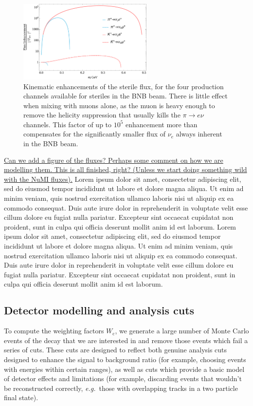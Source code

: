 \documentclass[11pt, a4paper]{article}
\def\eg{\emph{e.g.}}
\newcommand{\lorem}{ \textcolor[rgb]{0.8,0.8,0.8}{Lorem ipsum dolor sit amet, consectetur
adipiscing elit, sed do eiusmod tempor incididunt ut labore et dolore magna
aliqua. Ut enim ad minim veniam, quis nostrud exercitation ullamco laboris nisi
ut aliquip ex ea commodo consequat. Duis aute irure dolor in reprehenderit in
voluptate velit esse cillum dolore eu fugiat nulla pariatur. Excepteur sint
occaecat cupidatat non proident, sunt in culpa qui officia deserunt mollit anim
id est laborum.}}
\newcommand{\newtext}[2]{\textcolor{#1}{\ul{#2}}}
\begin{document}
\begin{figure}[t]
\center
\includegraphics[width=0.6\textwidth]{figures/BNB_flux_enhancement.pdf}

\caption{\label{fig:flux_enhancement} Kinematic enhancements of the sterile flux, for the four production channels available for steriles in the BNB beam. There is little effect when mixing with muons alone, as the muon is heavy enough to remove the helicity suppression that usually kills the $\pi\rightarrow e \nu$ channels. This factor of up to $10^5$ enhancement more than compensates for the significantly smaller flux of $\nu_e$ always inherent in the BNB beam.}

\end{figure}



%
\newtext{PB}{Can we add a figure of the fluxes? Perhaps some comment on how we
are modelling them. This is all finished, right? (Unless we start doing
something wild with the NuMI fluxes).}
%
\lorem\lorem 

\subsection{Detector modelling and analysis cuts}

To compute the weighting factors $W_\text{c}$, we generate a large number of
Monte Carlo events of the decay that we are interested in and remove those
events which fail a series of cuts. These cuts are designed to reflect both
genuine analysis cuts designed to enhance the signal to background ratio (for
example, choosing events with energies within certain ranges), as well as cuts
which provide a basic model of detector effects and limitations (for example,
discarding events that wouldn't be reconstructed correctly, \eg\ those with
overlapping tracks in a two particle final state).
\end{document}
